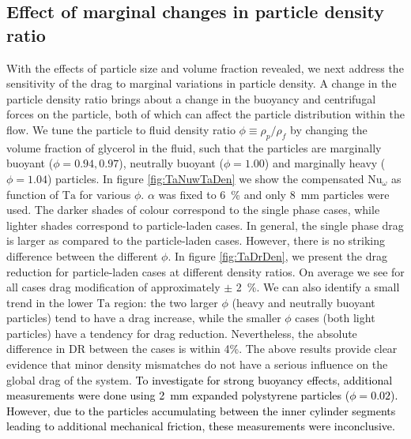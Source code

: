 \documentclass{jfm}
\newcommand\Nus{\text{Nu}}
\newcommand\Tay{\text{Ta}}
\newcommand{\red}[1]{\textcolor{black}{#1}}
\begin{document}
\subsection{Effect of marginal changes in particle density ratio}
With the effects of particle size and volume fraction revealed, we next
address the sensitivity of the drag to marginal variations in particle
density. A change in the particle density ratio brings about a change in the
buoyancy and  centrifugal forces on the particle, both of which can affect the
particle distribution within the flow. We tune the particle to fluid density
ratio $\phi \equiv \rho_p/\rho_f$ by changing the volume fraction of glycerol
in the fluid, such that the particles are marginally buoyant ($\phi = 0.94,
0.97$), neutrally buoyant ($\phi=1.00$) and marginally heavy ($\phi=1.04$)
particles. In figure \ref{fig:TaNuwTaDen} we show the compensated
$\Nus_\omega$ as function of $\Tay$ for various $\phi$. $\alpha$ was fixed to
\SI{6}{\percent} and only \SI{8}{\milli\metre} particles were used. The darker
shades of colour correspond to the single phase cases, while lighter shades
correspond to particle-laden cases. In general, the single phase drag is
larger as compared to the particle-laden cases. However, there is no striking
difference between the different $\phi$.  In figure \ref{fig:TaDrDen}, we
present the drag reduction for particle-laden cases at different density
ratios. On average we see for all cases drag modification of approximately
$\pm$ \SI{2}{\percent}. We can also identify a small trend in the lower $\Tay$
region: the two larger $\phi$ (heavy and neutrally buoyant particles) tend to
have a drag increase, while the smaller $\phi$ cases (both light particles)
have a tendency for drag reduction. Nevertheless, the absolute difference in
DR between the cases is within 4\%. The above results provide clear evidence
that minor density mismatches do not have a serious influence on the global
drag of the system.  \red{ To investigate for strong buoyancy effects,
additional measurements were done using \SI{2}{\milli\metre} expanded
polystyrene particles ($\phi=0.02$).  However, due to the particles
accumulating between the inner cylinder segments leading to additional
mechanical friction, these measurements were inconclusive.
}
\end{document}
